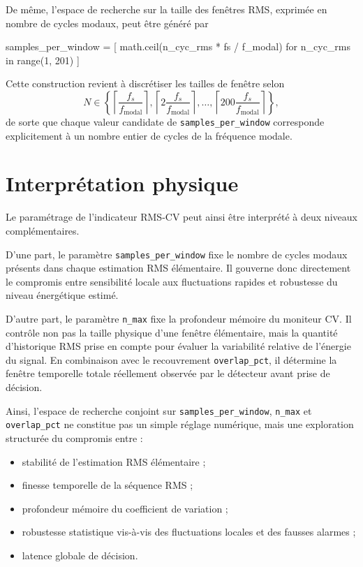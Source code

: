 \documentclass[12pt,a4paper, openany]{book}
\begin{document}
De même, l'espace de recherche sur la taille des fenêtres RMS, exprimée en nombre de cycles modaux, peut être généré par

\begin{codeboxpro}
samples_per_window = [
    math.ceil(n_cyc_rms * fs / f_modal)
    for n_cyc_rms in range(1, 201)
]
\end{codeboxpro}

Cette construction revient à discrétiser les tailles de fenêtre selon
\begin{equation}
N \in \left\{
\left\lceil \frac{f_s}{f_{\mathrm{modal}}} \right\rceil,
\left\lceil 2\frac{f_s}{f_{\mathrm{modal}}} \right\rceil,
\dots,
\left\lceil 200\frac{f_s}{f_{\mathrm{modal}}} \right\rceil
\right\},
\end{equation}
de sorte que chaque valeur candidate de \texttt{samples\_per\_window} corresponde explicitement à un nombre entier de cycles de la fréquence modale.

\section{Interprétation physique}

Le paramétrage de l'indicateur RMS-CV peut ainsi être interprété à deux niveaux complémentaires.

D'une part, le paramètre \texttt{samples\_per\_window} fixe le nombre de cycles modaux présents dans chaque estimation RMS élémentaire. Il gouverne donc directement le compromis entre sensibilité locale aux fluctuations rapides et robustesse du niveau énergétique estimé.
\medskip

D'autre part, le paramètre \texttt{n\_max} fixe la profondeur mémoire du moniteur CV. Il contrôle non pas la taille physique d'une fenêtre élémentaire, mais la quantité d'historique RMS prise en compte pour évaluer la variabilité relative de l'énergie du signal. En combinaison avec le recouvrement \texttt{overlap\_pct}, il détermine la fenêtre temporelle totale réellement observée par le détecteur avant prise de décision.
\medskip

Ainsi, l'espace de recherche conjoint sur \texttt{samples\_per\_window}, \texttt{n\_max} et \texttt{overlap\_pct} ne constitue pas un simple réglage numérique, mais une exploration structurée du compromis entre :
\begin{itemize}
    \item stabilité de l'estimation RMS élémentaire ;
    \item finesse temporelle de la séquence RMS ;
    \item profondeur mémoire du coefficient de variation ;
    \item robustesse statistique vis-à-vis des fluctuations locales et des fausses alarmes ;
    \item latence globale de décision.
\end{itemize}
\medskip
\end{document}
